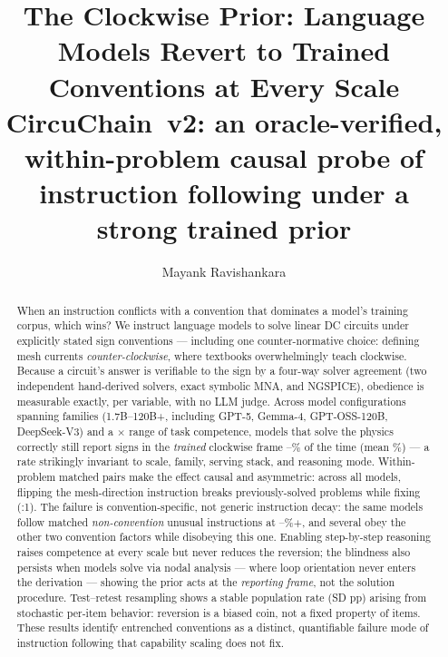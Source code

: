 \documentclass[11pt]{article}
\title{\textbf{The Clockwise Prior: Language Models Revert to Trained
Conventions at Every Scale}\\[4pt]
\large CircuChain~v2: an oracle-verified, within-problem causal probe of
instruction following under a strong trained prior}
\author{Mayank Ravishankara}
\date{}
\begin{document}
\maketitle

\begin{abstract}
When an instruction conflicts with a convention that dominates a model's
training corpus, which wins? We instruct language models to solve linear DC
circuits under explicitly stated sign conventions --- including one
counter-normative choice: defining mesh currents \emph{counter-clockwise},
where textbooks overwhelmingly teach clockwise. Because a circuit's answer is
verifiable to the sign by a four-way solver agreement (two independent
hand-derived solvers, exact symbolic MNA, and NGSPICE), obedience is measurable
exactly, per variable, with no LLM judge. Across \NColumns{} model
configurations spanning \NFamilies{} families (1.7B--120B+, including GPT-5,
Gemma-4, GPT-OSS-120B, DeepSeek-V3) and a \CompetenceSpanX$\times$ range of
task competence, models that solve the physics correctly still report signs in
the \emph{trained} clockwise frame \BandMin--\BandMax\% of the time (mean
\BandMean\%) --- a rate strikingly invariant to scale, family, serving stack,
and reasoning mode. Within-problem matched pairs make the effect causal and
asymmetric: across all models, flipping the mesh-direction instruction breaks
\AggB{} previously-solved problems while fixing \AggC{}
(\AggRatio:1). The failure is convention-specific, not generic
instruction decay: the same models follow matched \emph{non-convention}
unusual instructions at \CtlDsRev--\CtlGemmaSci\%$+$, and several obey the
other two convention factors while disobeying this one. Enabling step-by-step
reasoning raises competence at every scale but never reduces the reversion;
the blindness also persists when models solve via nodal analysis --- where loop
orientation never enters the derivation --- showing the prior acts at the
\emph{reporting frame}, not the solution procedure. Test--retest resampling
shows a stable population rate (SD \RetestSD{}pp) arising from stochastic
per-item behavior: reversion is a biased coin, not a fixed property of items.
These results identify entrenched conventions as a distinct, quantifiable
failure mode of instruction following that capability scaling does not fix.
\end{abstract}

\end{document}
